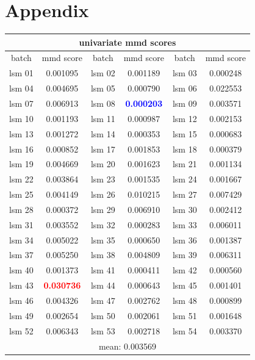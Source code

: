 \appendix
\chapter{Appendix}
\captionsetup{list=no}
\begin{table}[h!]
    \centering
    \begin{tabular}{|c c | c c | c c|} 
        \multicolumn{6}{c}{univariate mmd scores}\\
        \hline
        batch & mmd score & batch & mmd score  & batch & mmd score \\
        \hline\hline
        lsm 01 & 0.001095 &
        lsm 02 & 0.001189 &
        lsm 03 & 0.000248 \\
        lsm 04 & 0.004695 &
        lsm 05 & 0.000790 &
        lsm 06 & 0.022553 \\
        lsm 07 & 0.006913 &
        lsm 08 & \textbf{\textcolor{blue}{0.000203}} &
        lsm 09 & 0.003571 \\
        lsm 10 & 0.001193 &
        lsm 11 & 0.000987 &
        lsm 12 & 0.002153 \\
        lsm 13 & 0.001272 &
        lsm 14 & 0.000353 &
        lsm 15 & 0.000683 \\
        lsm 16 & 0.000852 &
        lsm 17 & 0.001853 &
        lsm 18 & 0.000379 \\
        lsm 19 & 0.004669 &
        lsm 20 & 0.001623 &
        lsm 21 & 0.001134 \\
        lsm 22 & 0.003864 &
        lsm 23 & 0.001535 &
        lsm 24 & 0.001667 \\
        lsm 25 & 0.004149 &
        lsm 26 & 0.010215 &
        lsm 27 & 0.007429 \\
        lsm 28 & 0.000372 &
        lsm 29 & 0.006910 &
        lsm 30 & 0.002412 \\
        lsm 31 & 0.003552 &
        lsm 32 & 0.000283 &
        lsm 33 & 0.006011 \\
        lsm 34 & 0.005022 &
        lsm 35 & 0.000650 &
        lsm 36 & 0.001387 \\
        lsm 37 & 0.005250 &
        lsm 38 & 0.004809 &
        lsm 39 & 0.006311 \\
        lsm 40 & 0.001373 &
        lsm 41 & 0.000411 &
        lsm 42 & 0.000560 \\
        lsm 43 & \textbf{\textcolor{red}{0.030736}} &
        lsm 44 & 0.000643 &
        lsm 45 & 0.001401 \\
        lsm 46 & 0.004326 &
        lsm 47 & 0.002762 &
        lsm 48 & 0.000899 \\
        lsm 49 & 0.002654 &
        lsm 50 & 0.002061 &
        lsm 51 & 0.001648 \\
        lsm 52 & 0.006343 &
        lsm 53 & 0.002718 &
        lsm 54 & 0.003370 \\
        \hline
        \multicolumn{6}{c}{mean: 0.003569}
    \end{tabular}


\end{table}
